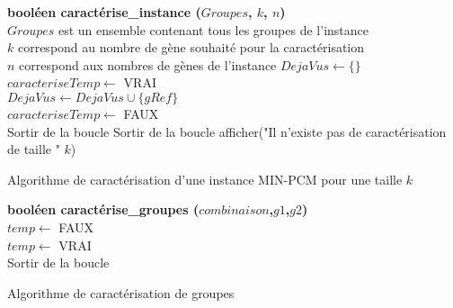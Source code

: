 \begin{algorithm}
	\textbf{booléen caractérise\_instance ($Groupes$, $k$, $n$)}\\
	\tcp
	{
		$Groupes$ est un ensemble contenant tous les groupes de l'instance\\
		$k$ correspond au nombre de gène souhaité pour la caractérisation\\
		$n$ correspond aux nombres de gènes de l'instance
	}	
	{
		$DejaVus \leftarrow \{ \}$\\
		$caracteriseTemp \leftarrow$ VRAI\\
		{
			$DejaVus \leftarrow DejaVus \cup \{gRef\}$\\
			{
					{
					$caracteriseTemp \leftarrow$ FAUX\\
					Sortir de la boucle
					}
			}
			 {Sortir de la boucle}
		}
		 {}
	}
	afficher("Il n'existe pas de caractérisation de taille " $k$)\\
	\caption{Algorithme de caractérisation d'une instance MIN-PCM pour une taille $k$}
	\label{algoCaractInstance}
\end{algorithm}

\begin{algorithm}
	\textbf{booléen caractérise\_groupes ($combinaison$,$g1$,$g2$)}\\
	{
		{
			$temp \leftarrow$ FAUX\\
			{
					{
						$temp \leftarrow$ VRAI\\
						Sortir de la boucle
					}
			}
			 {}
		}
	}
	\caption{Algorithme de caractérisation de groupes}
	\label{algoCaractGroupes}
\end{algorithm}

